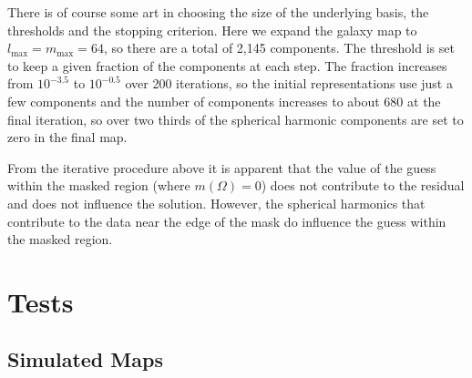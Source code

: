 \documentclass[useAMS,usenatbib]{mn2e}
\begin{document}
There is of course some art in choosing the size of the underlying
basis, the thresholds and the stopping criterion.  Here we expand the
galaxy map to $l_\mathrm{max}=m_\mathrm{max}=64$, so there are a total
of 2,145 components.  The threshold is set to keep a given fraction of
the components at each step.  The fraction increases from $10^{-3.5}$
to $10^{-0.5}$ over 200 iterations, so the initial representations use
just a few components and the number of components increases to about
680 at the final iteration, so over two thirds of the spherical
harmonic components are set to zero in the final map.

From the iterative procedure above it is apparent that the value of
the guess within the masked region (where $m(\Omega)=0$) does not
contribute to the residual and does not influence the solution.
However, the spherical harmonics that contribute to the data near the
edge of the mask do influence the guess within the masked region.


\section{Tests}
\label{sec:tests}


\subsection{Simulated Maps}
\label{sec:simulated-maps}
\end{document}
